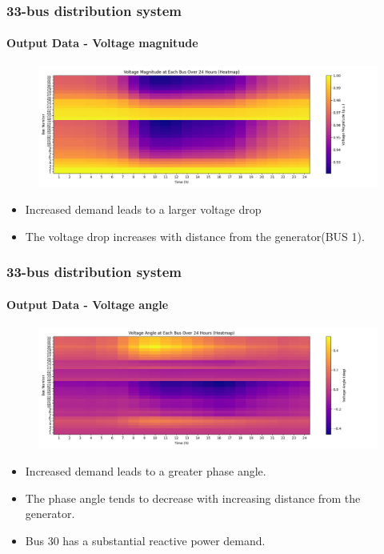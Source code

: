 \documentclass[
	11pt, %
	aspectratio=169, %
]{beamer}
\begin{document}
\begin{frame}
	\frametitle{33-bus distribution system}
	\framesubtitle{Output Data - Voltage magnitude}

	\begin{figure}
		\includegraphics[width=5 in,keepaspectratio]{../fig/V_mag_heatmap.png}
	\end{figure}

	\begin{itemize}
		\item Increased demand leads to a larger voltage drop
		\item The voltage drop increases with distance from the generator(BUS 1).
	\end{itemize}

	
\end{frame}


\begin{frame}
	\frametitle{33-bus distribution system}
	\framesubtitle{Output Data - Voltage angle}

	\begin{figure}
		\includegraphics[width=5 in,keepaspectratio]{../fig/V_ang_heatmap.png}
	\end{figure}

		\begin{itemize}
		\item Increased demand leads to a greater phase angle.
		\item The phase angle tends to decrease with increasing distance from the generator.
		\item Bus 30 has a substantial reactive power demand.
	\end{itemize}

	
\end{frame}
\end{document}
